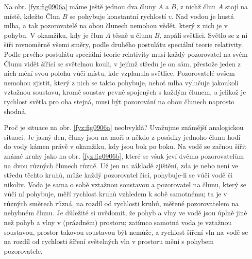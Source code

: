 \begin{mdframed}[style=mdexam]
  \begin{example}\label{fyz:fey_exam017}
    Na obr. \ref{fyz:fig0906a} máme ještě jednou dva čluny \(A\) a \(B\), z nichž člun \(A\) stojí na
    místě, kdežto Člun \(B\) se pohybuje konstantní rychlostí \(v\). Nad vodou je hustá mlha, a tak
    pozorovatelé na obou člunech nemohou vědět, který z nich je v pohybu. V okamžiku, kdy je člun
    \(A\) těsně u člunu \(B\), zapálí světlici. Světlo se z ní šíři rovnoměrně všemi směry, podle
    druhého postulátu speciální teorie rela­tivity. Podle prvého postulátu speciální teorie
    relativity musí každý pozorovatel na svém Člunu vidět šířící se světelnou kouli, v jejímž středu
    je on sám, přestože jeden z nich mění svou polohu vůči místu, kde vzplanula světlice.
    Pozorovatelé ovšem nemohou zjistit, který z nich se takto pohybuje, neboť mlha vylučuje
    jakoukoli vztažnou soustavu, kromě soustav pevně spojených s každým člunem, a jelikož je
    rychlost světla pro oba stejná, musí být pozorování na obou člunech naprosto shodná.

    {\centering
    \captionsetup{type=figure}
    \par}
    \vspace{1em}

    Proč je situace na obr. \ref{fyz:fig0906a} neobvyklá? Uvažujme známější analogickou situaci. Je
    jasný den, čluny jsou na moři a někdo z posádky jednoho člunu hodí do vody kámen právě v
    okamžiku, kdy jsou bok po boku. Na vodě se začnou šířit známé kruhy jako na obr.
    \ref{fyz:fig0906b}, které se však jeví dvěma pozorovatelům na dvou různých člunech různě. Už jen
    na základě zjištění, zda je nebo není ve středu těchto kruhů, může každý pozorovatel říci,
    pohybuje-li se vůči vodě či nikoliv. Voda je sama o sobě vztažnou soustavou a pozorovatel na
    člunu, který se vůči ní pohybuje, měří rychlost kruhů vzhledem k sobě samotnému; ta je v různých
    směrech různá, na rozdíl od rychlosti kruhů, měřené pozorovatelem na nehybném člunu. Je důležité
    si uvědomit, že pohyb a vlny ve vodě jsou úplně jiné než pohyb a vlny v (prázdném) prostoru;
    zatímco samotná voda je vztažnou soustavou, prostor takovou soustavou být nemůže, a rychlost
    šíření vln na vodě se na rozdíl od rychlosti šíření světelných vln v prostoru mění s pohybem
    pozorovatele.

    {\centering
    \captionsetup{type=figure}
    \par}
    \vspace{1em}

  \end{example}
\end{mdframed}
